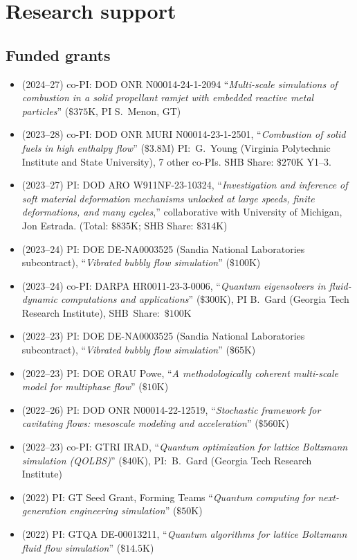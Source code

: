 \section{Research support}



\subsection{Funded grants}

\begin{itemize}
    \item (2024--27) co-PI: DOD ONR N00014-24-1-2094 ``\textit{Multi-scale simulations of combustion in a solid propellant ramjet with embedded reactive metal particles}'' ($\$375$K, PI S.\ Menon, GT)
    \item (2023--28) co-PI: DOD ONR MURI N00014-23-1-2501, ``\textit{Combustion of solid fuels in high enthalpy flow}'' ($\$3.8$M) PI:~G.~Young (Virginia Polytechnic Institute and State University), 7 other co-PIs. SHB Share: $\$270$K Y1--3.
    \item (2023--27) PI: DOD ARO W911NF-23-10324, ``\textit{Investigation and inference of soft material deformation mechanisms unlocked at large speeds, finite deformations, and many cycles},'' collaborative with University of Michigan, Jon Estrada. (Total: $\$835$K; SHB Share: $\$314$K)
    \item (2023--24) PI: DOE DE-NA0003525 (Sandia National Laboratories subcontract), ``\textit{Vibrated bubbly flow simulation}'' ($\$100$K)
    \item (2023--24) co-PI: DARPA HR0011-23-3-0006, ``\textit{Quantum eigensolvers in fluid-dynamic computations and applications}'' ($\$300$K), PI B.~Gard (Georgia Tech Research Institute), SHB~Share:~$\$100$K
    \item (2022--23) PI: DOE DE-NA0003525 (Sandia National Laboratories subcontract), ``\textit{Vibrated bubbly flow simulation}'' ($\$65$K)
    \item (2022--23) PI: DOE ORAU Powe, ``\textit{A methodologically coherent multi-scale model for multiphase flow}'' ($\$10$K)
    \item (2022--26) PI: DOD ONR N00014-22-12519, ``\textit{Stochastic framework for cavitating flows: mesoscale modeling and acceleration}'' ($\$560$K)
    \item (2022--23) co-PI: GTRI IRAD, ``\textit{Quantum optimization for lattice Boltzmann simulation (QOLBS)}'' ($\$40$K), PI:~B.~Gard (Georgia Tech Research Institute)
    \item (2022) PI: GT Seed Grant, Forming Teams ``\textit{Quantum computing for next-generation engineering simulation}'' ($\$50$K)
    \item (2022) PI: GTQA DE-00013211, ``\textit{Quantum algorithms for lattice Boltzmann fluid flow simulation}'' ($\$14.5$K)
\end{itemize}

